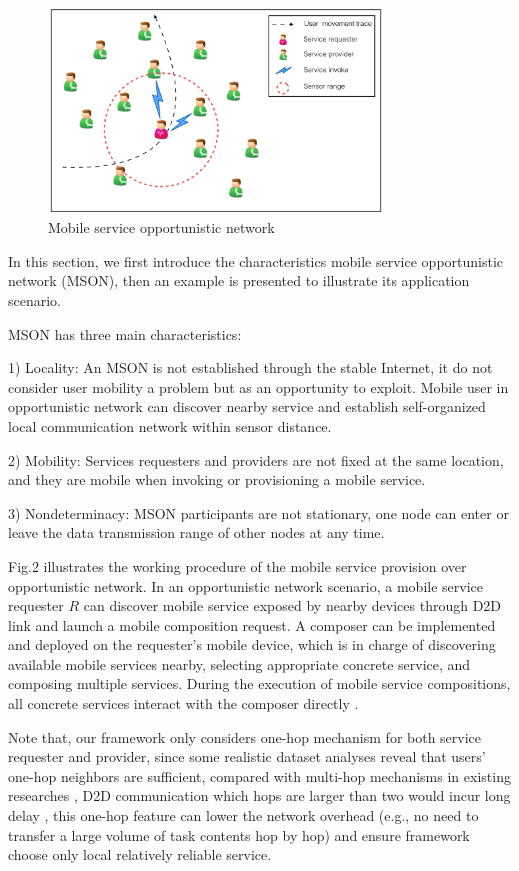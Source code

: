 \documentclass[10pt,journal,compsoc]{IEEEtran}
\begin{document}
\begin{figure}[!t]
\centering
\includegraphics[width=3.5in]{./img/pic2.png}
\caption{Mobile service opportunistic network}
\label{fig_mson}
\end{figure}

In this section, we first introduce the characteristics mobile service opportunistic network (MSON), then an example is presented to illustrate its application scenario.

MSON has three main characteristics:

1) Locality: An MSON is not established through the stable Internet, it do not consider user mobility a problem but as an opportunity to exploit. Mobile user in opportunistic network can discover nearby service and establish self-organized local communication network within sensor distance.

2) Mobility: Services requesters and providers are not fixed at the same location, and they are mobile when invoking or provisioning a mobile service.

3) Nondeterminacy: MSON participants are not stationary, one node can enter or leave the data transmission range of other nodes at any time. 

Fig.2 illustrates the working procedure of the mobile service provision over opportunistic network. In an opportunistic network scenario, a mobile service requester $R$ can discover mobile service exposed by nearby devices through D2D link and launch a mobile composition request. A composer can be implemented and deployed on the requester's mobile device, which is in charge of discovering available mobile services nearby, selecting appropriate concrete service, and composing multiple services. During the execution of mobile service compositions, all concrete services interact with the composer directly \cite{Deng2017}.

Note that, our framework only considers one-hop mechanism for both service requester and provider, since some realistic dataset analyses reveal that users' one-hop neighbors are sufficient, compared with multi-hop mechanisms in existing researches \cite{chang2015progressive,karaliopoulos2015user,han2016competition,tuncay2013participant,wu2013homing,jiang2016exploiting,liu2013exploring}, D2D communication which hops are larger than two would incur long delay \cite{li2014can},  this one-hop feature can lower the network overhead (e.g., no need to transfer a large volume of task contents hop by hop) and ensure framework choose only local relatively reliable service. 
\end{document}

